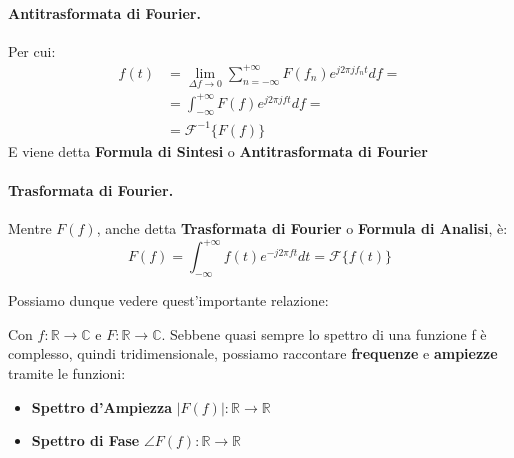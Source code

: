 \paragraph{Antitrasformata di Fourier.}Per cui:
\begin{align*}
    f(t) &= \lim_{\Delta f \to 0} \sum_{n = -\infty}^{+\infty} F(f_n) e^{j2 \pi j f_n t} df =\\
         &= \int_{-\infty}^{+\infty} F(f) e^{j2 \pi j f t} df =\\
         &= \mathscr{F}^{-1}\{F(f)\}
\end{align*}
E viene detta \textbf{Formula di Sintesi} o \textbf{Antitrasformata di Fourier}
\paragraph{Trasformata di Fourier.}Mentre $F(f)$, anche detta \textbf{Trasformata di Fourier} o \textbf{Formula di Analisi}, è:
\begin{equation}
    F(f) = \int_{-\infty}^{+\infty} f(t) e^{-j2 \pi f t} dt = \mathscr{F}\{f(t)\}
\end{equation}


\begin{minipage}{\textwidth}
    Possiamo dunque vedere quest'importante relazione:\\
\begin{center}
    \end{center}
    Con $f : \mathbb{R} \rightarrow \mathbb{C}$ e $F : \mathbb{R} \rightarrow \mathbb{C}$. Sebbene quasi sempre lo spettro di una
funzione f è complesso, quindi tridimensionale, possiamo raccontare \textbf{frequenze} e \textbf{ampiezze} tramite le funzioni:
\begin{itemize}
    \item \textbf{Spettro d'Ampiezza} $|F(f)| : \mathbb{R} \rightarrow \mathbb{R}$
    \item \textbf{Spettro di Fase} $\angle F(f) : \mathbb{R} \rightarrow \mathbb{R}$
\end{itemize} 

\end{minipage}
